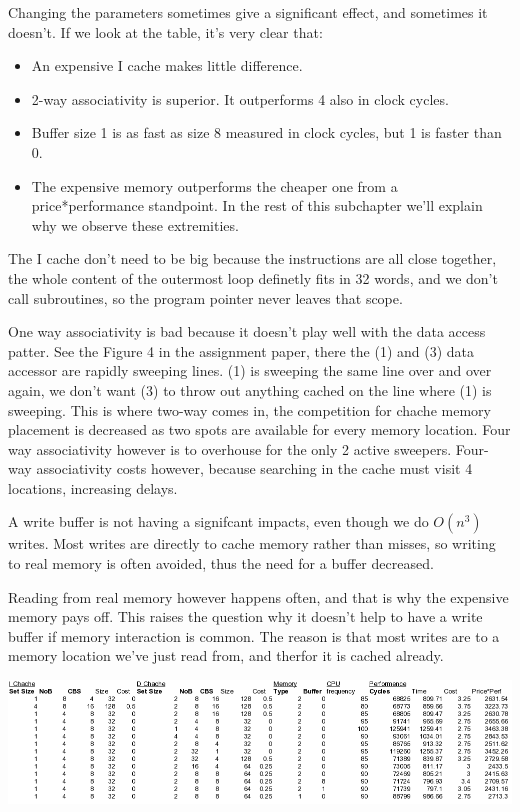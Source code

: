 \documentclass[a4paper,11pt]{article}
\begin{document}
Changing the parameters sometimes give a significant effect, and sometimes it doesn't. If we look at the table, it's very clear that:
\begin{itemize}
\item An expensive I cache makes little difference.
\item 2-way associativity is superior. It outperforms 4 also in clock cycles.
\item Buffer size 1 is as fast as size 8 measured in clock cycles, but 1 is faster than 0.
\item The expensive memory outperforms the cheaper one from a price*performance standpoint.
In the rest of this subchapter we'll explain why we observe these extremities.
\end{itemize}
The I cache don't need to be big because the instructions are all close together, the whole content of the outermost loop definetly fits in 32 words, and we don't call subroutines, so the program pointer never leaves that scope.

One way associativity is bad because it doesn't play well with the data access patter.
See the Figure 4 in the assignment paper, there the (1) and (3) data accessor are rapidly sweeping lines.
(1) is sweeping the same line over and over again, we don't want (3) to throw out anything cached on the line where (1) is sweeping.
This is where two-way comes in, the competition for chache memory placement is decreased as two spots are available for every memory location.
Four way associativity however is to overhouse for the only 2 active sweepers.
Four-way associativity costs however, because searching in the cache must visit 4 locations, increasing delays.

A write buffer is not having a signifcant impacts, even though we do $O(n^3)$ writes.
Most writes are directly to cache memory rather than misses, so writing to real memory is often avoided, thus the need for a buffer decreased.

Reading from real memory however happens often, and that is why the expensive memory pays off.
This raises the question why it doesn't help to have a write buffer if memory interaction is common.
The reason is that most writes are to a memory location we've just read from, and therfor it is cached already.

\includegraphics[angle=270]{table.png}
\end{document}
